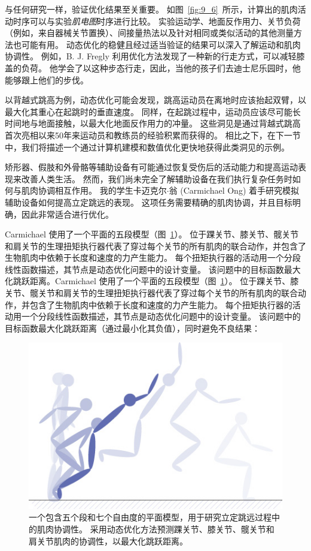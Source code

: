 与任何研究一样，验证优化结果至关重要。
如图~\ref{fig:9_6}~所示，计算出的肌肉活动时序可以与实验\textit{肌电图}时序进行比较。
实验运动学、地面反作用力、关节负荷（例如，来自器械关节置换）、间接量热法以及针对相同或类似活动的其他测量方法也可能有用。
动态优化的稳健且经过适当验证的结果可以深入了解运动和肌肉协调性。
例如，B. J. Fregly 利用优化方法发现了一种新的行走方式，可以减轻膝盖的负荷\cite{fregly2007design}。
他学会了以这种步态行走，因此，当他的孩子们去迪士尼乐园时，他能够跟上他们的步伐。


以背越式跳高为例，动态优化可能会发现，跳高运动员在离地时应该抬起双臂，以最大化其重心在起跳时的垂直速度。
同样，在起跳过程中，运动员应该尽可能长时间地与地面接触，以最大化地面反作用力的冲量。
这些洞见是通过背越式跳高首次亮相以来50年来运动员和教练员的经验积累而获得的。
相比之下，在下一节中，我们将描述一个通过计算机建模和数值优化更快地获得此类洞见的示例。




矫形器、假肢和外骨骼等辅助设备有可能通过恢复受伤后的活动能力和提高运动表现来改善人类生活。
然而，我们尚未完全了解辅助设备在我们执行复杂任务时如何与肌肉协调相互作用。
我的学生卡迈克尔$\cdot$翁 (Carmichael Ong) 着手研究模拟辅助设备如何提高立定跳远的表现。
这项任务需要精确的肌肉协调，并且目标明确，因此非常适合进行优化。


Carmichael 使用了一个平面的五段模型（图~\ref{fig:9_16}）。
位于踝关节、膝关节、髋关节和肩关节的生理扭矩执行器代表了穿过每个关节的所有肌肉的联合动作，并包含了生物肌肉中依赖于长度和速度的力产生能力。
每个扭矩执行器的活动用一个分段线性函数描述，其节点是动态优化问题中的设计变量。
该问题中的目标函数最大化跳跃距离。Carmichael 使用了一个平面的五段模型（图~\ref{fig:9_16}）。
位于踝关节、膝关节、髋关节和肩关节的生理扭矩执行器代表了穿过每个关节的所有肌肉的联合动作，并包含了生物肌肉中依赖于长度和速度的力产生能力。
每个扭矩执行器的活动用一个分段线性函数描述，其节点是动态优化问题中的设计变量。
该问题中的目标函数最大化跳跃距离（通过最小化其负值），同时避免不良结果：
%
\begin{figure}[!htb]
	\centering
	\includegraphics[width=0.8\linewidth]{chap9/9_16}
	\caption{一个包含五个段和七个自由度的平面模型，用于研究立定跳远过程中的肌肉协调性。
		采用动态优化方法预测踝关节、膝关节、髋关节和肩关节肌肉的协调性，以最大化跳跃距离\cite{ong2015simulation}。 \label{fig:9_16}}
\end{figure}


